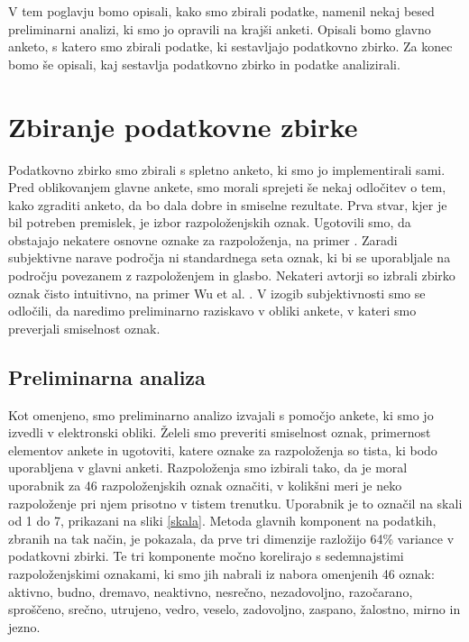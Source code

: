 \documentclass[a4paper, 12pt]{book}
\begin{document}
{V tem poglavju bomo opisali, kako smo zbirali podatke, namenil nekaj besed preliminarni analizi, ki smo jo opravili na krajši anketi. Opisali bomo glavno anketo, s katero smo zbirali podatke, ki sestavljajo podatkovno zbirko. Za konec bomo še opisali, kaj sestavlja podatkovno zbirko in podatke analizirali. 


\section{Zbiranje podatkovne zbirke}

Podatkovno zbirko smo zbirali s spletno anketo, ki smo jo implementirali sami. Pred oblikovanjem glavne ankete, smo morali sprejeti še nekaj odločitev o tem, kako zgraditi anketo, da bo dala dobre in smiselne rezultate. Prva stvar, kjer je bil potreben premislek, je izbor razpoloženjskih oznak. Ugotovili smo, da obstajajo nekatere osnovne oznake za razpoloženja, na primer \cite{dalgleish1999handbook}. Zaradi subjektivne narave področja ni standardnega seta oznak, ki bi se uporabljale na področju povezanem z razpoloženjem in glasbo. Nekateri avtorji so izbrali zbirko oznak čisto intuitivno, na primer Wu et al. \cite{Wu2013}. V izogib subjektivnosti smo se odločili, da naredimo preliminarno raziskavo v obliki ankete, v kateri smo preverjali smiselnost oznak. 

\subsection{Preliminarna analiza}
\label{preiliminarnaana}

Kot omenjeno, smo preliminarno analizo izvajali s pomočjo ankete, ki smo jo izvedli v elektronski obliki. Želeli smo preveriti smiselnost oznak, primernost elementov ankete in ugotoviti, katere oznake za razpoloženja so tista, ki bodo uporabljena v glavni anketi. Razpoloženja smo izbirali tako, da je moral uporabnik za 46 razpoloženjskih oznak označiti, v kolikšni meri je neko razpoloženje pri njem prisotno v tistem trenutku. Uporabnik je to označil na skali od 1 do 7, prikazani na sliki \ref{skala}. Metoda glavnih komponent na podatkih, zbranih na tak način, je pokazala, da prve tri dimenzije razložijo 64\% variance v podatkovni zbirki. Te tri komponente močno korelirajo s sedemnajstimi razpoloženjskimi oznakami, ki smo jih nabrali iz nabora omenjenih 46 oznak: aktivno, budno, dremavo, neaktivno, nesrečno, nezadovoljno, razočarano, sproščeno, srečno, utrujeno, vedro, veselo, zadovoljno, zaspano, žalostno, mirno in jezno.

}
\end{document}
